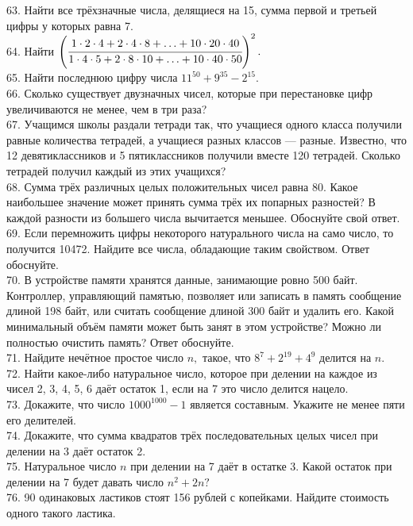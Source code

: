 \documentclass[12pt]{article}
\begin{document}
63. Найти все трёхзначные числа, делящиеся на 15, сумма первой и третьей цифры у которых равна 7.\\
64. Найти $\left( \cfrac{1\cdot2\cdot4+2\cdot4\cdot8+\ldots+10\cdot20\cdot40}{1\cdot4\cdot5+2\cdot8\cdot10+\ldots+10\cdot40\cdot50}\right)^2.$\\
65. Найти последнюю цифру числа $11^{50}+9^{35}-2^{15}.$\\
66. Сколько существует двузначных чисел, которые при перестановке цифр увеличиваются не менее, чем в три раза?\\
67. Учащимся школы раздали тетради так, что учащиеся одного класса получили равные количества тетрадей, а учащиеся разных классов --- разные. Известно, что 12 девятиклассников и 5 пятиклассников получили вместе 120 тетрадей. Сколько тетрадей получил каждый из этих учащихся?\\
68. Сумма трёх различных целых положительных чисел равна 80. Какое наибольшее значение может принять сумма трёх их попарных разностей? В каждой разности из большего числа вычитается меньшее. Обоснуйте свой ответ.\\
69. Если перемножить цифры некоторого натурального числа на само число, то получится 10472. Найдите все числа, обладающие таким свойством. Ответ обоснуйте.\\
70. В устройстве памяти хранятся данные, занимающие ровно 500 байт. Контроллер, управляющий памятью, позволяет или записать в память сообщение длиной 198 байт, или считать сообщение длиной 300 байт и удалить его. Какой минимальный объём памяти может быть занят в этом устройстве? Можно ли полностью очистить память? Ответ обоснуйте.\\
71. Найдите нечётное простое число $n,$ такое, что $8^7+2^{19}+4^9$ делится на $n.$\\
72. Найти какое-либо натуральное число, которое при делении на каждое из чисел 2, 3, 4, 5, 6 даёт остаток 1, если на 7 это число делится нацело.\\
73. Докажите, что число $1000^{1000}-1$ является составным. Укажите не менее пяти его делителей.\\
74. Докажите, что сумма квадратов трёх последовательных целых чисел при делении на 3 даёт остаток 2.\\
75. Натуральное число $n$ при делении на 7 даёт в остатке 3. Какой остаток при делении на 7 будет давать число $n^2+2n?$\\
76. 90 одинаковых ластиков стоят 156 рублей с копейками. Найдите стоимость одного такого ластика.\\
\end{document}
